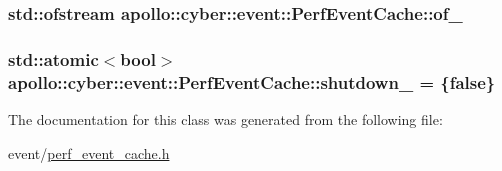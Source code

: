 \hypertarget{classapollo_1_1cyber_1_1event_1_1PerfEventCache_ad190a19395906ca0eede7b1526b64964}{
\subsubsection[{of\-\_\-}]{\setlength{\rightskip}{0pt plus 5cm}std\-::ofstream apollo\-::cyber\-::event\-::\-Perf\-Event\-Cache\-::of\-\_\-\hspace{0.3cm}{\ttfamily [private]}}}\label{classapollo_1_1cyber_1_1event_1_1PerfEventCache_ad190a19395906ca0eede7b1526b64964}
\hypertarget{classapollo_1_1cyber_1_1event_1_1PerfEventCache_a4f064542c80809a3d11e8d274e01a0f2}{
\subsubsection[{shutdown\-\_\-}]{\setlength{\rightskip}{0pt plus 5cm}std\-::atomic$<$bool$>$ apollo\-::cyber\-::event\-::\-Perf\-Event\-Cache\-::shutdown\-\_\- = \{false\}\hspace{0.3cm}{\ttfamily [private]}}}\label{classapollo_1_1cyber_1_1event_1_1PerfEventCache_a4f064542c80809a3d11e8d274e01a0f2}


The documentation for this class was generated from the following file\-:\begin{DoxyCompactItemize}
\item 
event/\hyperlink{perf__event__cache_8h}{perf\-\_\-event\-\_\-cache.\-h}\end{DoxyCompactItemize}
